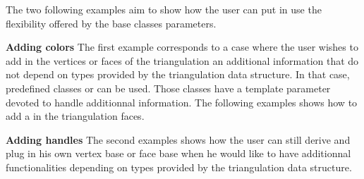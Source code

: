 The two following examples  aim to show how the user
can  put in use the flexibility offered by the
base classes parameters.

{\bf Adding colors} 
The first example corresponds to a case where the user wishes to add in 
the vertices or faces of the triangulation  an additional information
that do not depend on types provided
by the triangulation data structure. 
In that case, predefined classes
or 
can be used. Those classes have
a template parameter  devoted to
handle additionnal information.
The following examples shows how to add a 
 in the triangulation faces.



{\bf Adding handles}
The second examples  shows how the user can  still
derive and plug in his own vertex base 
or face base when he would like to have  
additionnal functionalities depending on types provided by the triangulation
data structure. 













